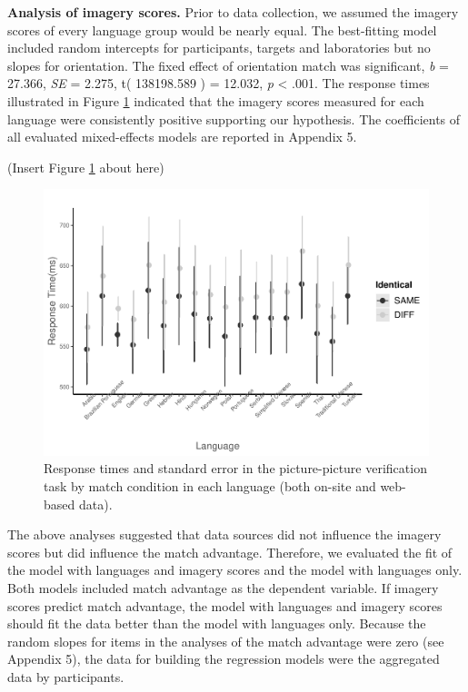 \documentclass[
  man]{apa6}
\begin{document}
\textbf{Analysis of imagery scores.} Prior to data collection, we assumed the imagery scores of every language group would be nearly equal. The best-fitting model included random intercepts for participants, targets and laboratories but no slopes for orientation. The fixed effect of orientation match was significant, \emph{b} = 27.366, \emph{SE} = 2.275, t( 138198.589 ) = 12.032, \emph{p} \textless{} .001. The response times illustrated in Figure \ref{fig:plot-PP-lme} indicated that the imagery scores measured for each language were consistently positive supporting our hypothesis. The coefficients of all evaluated mixed-effects models are reported in Appendix 5.

(Insert Figure \ref{fig:plot-PP-lme} about here)

\begin{figure}
\centering
\includegraphics{Stage2_Report_0228_files/figure-latex/plot-PP-lme-1.pdf}
\caption{\label{fig:plot-PP-lme}Response times and standard error in the picture-picture verification task by match condition in each language (both on-site and web-based data).}
\end{figure}

The above analyses suggested that data sources did not influence the imagery scores but did influence the match advantage. Therefore, we evaluated the fit of the model with languages and imagery scores and the model with languages only. Both models included match advantage as the dependent variable. If imagery scores predict match advantage, the model with languages and imagery scores should fit the data better than the model with languages only. Because the random slopes for items in the analyses of the match advantage were zero (see Appendix 5), the data for building the regression models were the aggregated data by participants.
\end{document}
